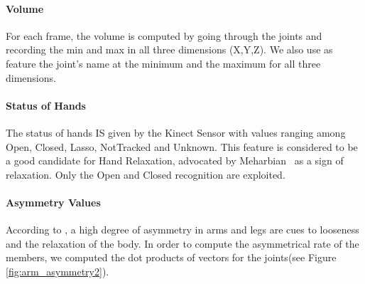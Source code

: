 \documentclass[smallextended]{svjour3}
\begin{document}
\paragraph{Volume}
For each frame, the volume is computed by going through the joints and recording the min and max in all three dimensions (X,Y,Z). 
We also use as feature the joint's name at the minimum and the maximum for all three dimensions.

\paragraph{Status of Hands}
The status of hands IS given by the Kinect Sensor with values ranging among Open, Closed, Lasso, NotTracked and Unknown. 
This feature is considered to be a good candidate for Hand Relaxation, advocated by Meharbian~\cite{Meharbian} as a sign of relaxation. 
Only the Open and Closed recognition are exploited. 


\paragraph{Asymmetry Values}
According to \cite{Mehrabian}, a high degree of asymmetry in arms and legs are cues to looseness and the relaxation of the body.
In order to compute the asymmetrical rate of the members, we computed the dot products of vectors for the joints(see Figure \ref{fig:arm_asymmetry2}). 

\end{document}
